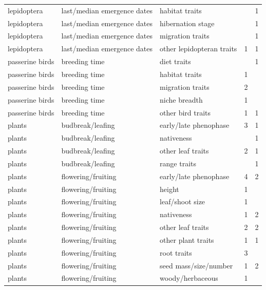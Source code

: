 \documentclass[11pt,letter]{article}
\begin{document}
\begin{table}[ht]
\begin{tabular}{lllrr}
  lepidoptera & last/median emergence dates & habitat traits &  &   1 \\ 
  lepidoptera & last/median emergence dates & hibernation stage &  &   1 \\ 
  lepidoptera & last/median emergence dates & migration traits &  &   1 \\ 
  lepidoptera & last/median emergence dates & other lepidopteran traits &   1 &   1 \\ 
  passerine birds & breeding time & diet traits &  &   1 \\ 
  passerine birds & breeding time & habitat traits &   1 &  \\ 
  passerine birds & breeding time & migration traits &   2 &  \\ 
  passerine birds & breeding time & niche breadth &   1 &  \\ 
  passerine birds & breeding time & other bird traits &   1 &   1 \\ 
  plants & budbreak/leafing & early/late phenophase &   3 &   1 \\ 
  plants & budbreak/leafing & nativeness &  &   1 \\ 
  plants & budbreak/leafing & other leaf traits &   2 &   1 \\ 
  plants & budbreak/leafing & range traits &  &   1 \\ 
  plants & flowering/fruiting & early/late phenophase &   4 &   2 \\ 
  plants & flowering/fruiting & height &   1 &  \\ 
  plants & flowering/fruiting & leaf/shoot size &   1 &  \\ 
  plants & flowering/fruiting & nativeness &   1 &   2 \\ 
  plants & flowering/fruiting & other leaf traits &   2 &   2 \\ 
  plants & flowering/fruiting & other plant traits &   1 &   1 \\ 
  plants & flowering/fruiting & root traits &   3 &  \\ 
  plants & flowering/fruiting & seed mass/size/number &   1 &   2 \\ 
  plants & flowering/fruiting & woody/herbaceous &   1 &  \\ 
   \hline
\end{tabular}
\endgroup
\end{table}
\end{document}

